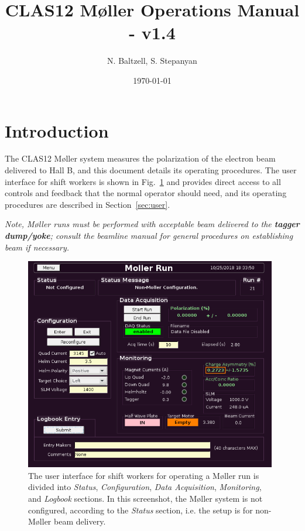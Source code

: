 \documentclass[amsmath,amssymb,notitlepage,12pt]{revtex4}
\begin{document}
\title{CLAS12 M{\o}ller Operations Manual - v1.4}
\date{\today}
\author{N. Baltzell, S. Stepanyan}
\begin{abstract}
\end{abstract}

\maketitle

\section{Introduction}
The CLAS12 M{\o}ller system measures the polarization of the electron beam delivered to Hall B, and this document details its operating procedures.  The user interface for shift workers is shown in Fig.~\ref{fig:unconfig} and provides direct access to all controls and feedback that the normal operator should need, and its operating procedures are described in Section~\ref{sec:user}.%

{\em \large Note, M{\o}ller runs must be performed with acceptable beam delivered to the {\bf tagger dump/yoke};  consult the beamline manual for general procedures on establishing beam if necessary.}

\begin{figure}[htbp]\centering
    \includegraphics[width=11cm]{pics/unconfig}
    \caption{The user interface for shift workers for operating a M{\o}ller run is divided into {\em Status}, {\em Configuration}, {\em Data Acquisition}, {\em Monitoring}, and {\em Logbook} sections.  In this screenshot, the M{\o}ller system is not configured, according to the {\em Status} section, i.e. the setup is for non-M{\o}ller beam delivery.\label{fig:unconfig}}
\end{figure}
\end{document}
